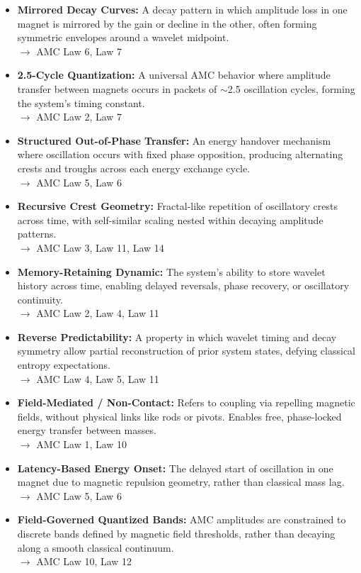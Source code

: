 \documentclass[10pt,aps,pre,onecolumn,superscriptaddress,notitlepage]{revtex4-2}
\begin{document}
\begin{itemize}
  \item \textbf{Mirrored Decay Curves:} A decay pattern in which amplitude loss in one magnet is mirrored by the gain or decline in the other, often forming symmetric envelopes around a wavelet midpoint.\\
  $\rightarrow$ AMC Law 6, Law 7

  \item \textbf{2.5-Cycle Quantization:} A universal AMC behavior where amplitude transfer between magnets occurs in packets of $\sim$2.5 oscillation cycles, forming the system’s timing constant.\\
  $\rightarrow$ AMC Law 2, Law 7

  \item \textbf{Structured Out-of-Phase Transfer:} An energy handover mechanism where oscillation occurs with fixed phase opposition, producing alternating crests and troughs across each energy exchange cycle.\\
  $\rightarrow$ AMC Law 5, Law 6

  \item \textbf{Recursive Crest Geometry:} Fractal-like repetition of oscillatory crests across time, with self-similar scaling nested within decaying amplitude patterns.\\
  $\rightarrow$ AMC Law 3, Law 11, Law 14

  \item \textbf{Memory-Retaining Dynamic:} The system’s ability to store wavelet history across time, enabling delayed reversals, phase recovery, or oscillatory continuity.\\
  $\rightarrow$ AMC Law 2, Law 4, Law 11

  \item \textbf{Reverse Predictability:} A property in which wavelet timing and decay symmetry allow partial reconstruction of prior system states, defying classical entropy expectations.\\
  $\rightarrow$ AMC Law 4, Law 5, Law 11

  \item \textbf{Field-Mediated / Non-Contact:} Refers to coupling via repelling magnetic fields, without physical links like rods or pivots. Enables free, phase-locked energy transfer between masses.\\
  $\rightarrow$ AMC Law 1, Law 10

  \item \textbf{Latency-Based Energy Onset:} The delayed start of oscillation in one magnet due to magnetic repulsion geometry, rather than classical mass lag.\\
  $\rightarrow$ AMC Law 5, Law 6

  \item \textbf{Field-Governed Quantized Bands:} AMC amplitudes are constrained to discrete bands defined by magnetic field thresholds, rather than decaying along a smooth classical continuum.\\
  $\rightarrow$ AMC Law 10, Law 12

\end{itemize}
\end{document}
